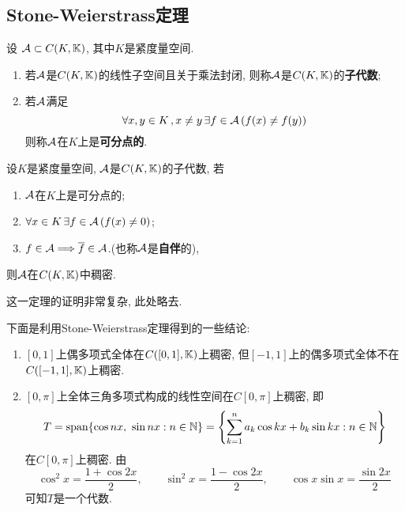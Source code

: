 \subsection{Stone-Weierstrass定理}

\begin{Definition}
	设 $ \mathcal{A}\subset C(K,\mathbb{K}) $, 其中$ K $是紧度量空间.
	\begin{enumerate}[(1)]
		\item 若$ \mathcal{A} $是$ C(K,\mathbb{K}) $的线性子空间且关于乘法封闭, 则称$ \mathcal{A} $是$ C(K,\mathbb{K}) $的\textbf{子代数};
		\item 若$ \mathcal{A} $满足
		      \[
			      \forall x,y\in K\,,x\ne y\,\exists f\in\mathcal{A}\,(f(x)\ne f(y))
		      \]
		      则称$ \mathcal{A} $在$ K $上是\textbf{可分点的}.
	\end{enumerate}
\end{Definition}

\begin{Theorem}
	设$ K $是紧度量空间, $ \mathcal{A} $是$ C(K,\mathbb{K}) $的子代数, 若
	\begin{enumerate}[(1)]
		\item $ \mathcal{A} $在$ K $上是可分点的;
		\item $ \forall x\in K\,\exists f\in\mathcal{A}\,(f(x)\ne 0) $;
		\item $ f\in\mathcal{A}\Longrightarrow \overline{f}\in\mathcal{A} $.(也称$ \mathcal{A} $是\textbf{自伴}的),
	\end{enumerate}
	则$ \mathcal{A} $在$ C(K,\mathbb{K}) $中稠密.
\end{Theorem}

这一定理的证明非常复杂, 此处略去.

\begin{Example}
	下面是利用Stone-Weierstrass定理得到的一些结论:
	\begin{enumerate}[(1)]
		\item $ [0,1] $上偶多项式全体在$ C([0,1],\mathbb{K}) $上稠密, 但$ [-1,1] $上的偶多项式全体不在$ C([-1,1],\mathbb{K}) $上稠密.
		\item $ [0,\pi] $上全体三角多项式构成的线性空间在$ C[0,\pi] $上稠密, 即
		      \[
			      T=\mathrm{span} \{ \cos nx,\ \sin nx : n\in\mathbb{N} \}=\left\{ \sum_{k=1}^na_k\cos kx+b_k\sin kx : n\in\mathbb{N} \right\}
		      \]
		      在$ C[0,\pi] $上稠密. 由
		      \[
			      \cos^2x=\frac{1+\cos 2x}{2},\qquad \sin^2x=\frac{1-\cos 2x}{2},\qquad \cos x\sin x=\frac{\sin 2x}{2}
		      \]
		      可知$ T $是一个代数.
	\end{enumerate}
\end{Example}
